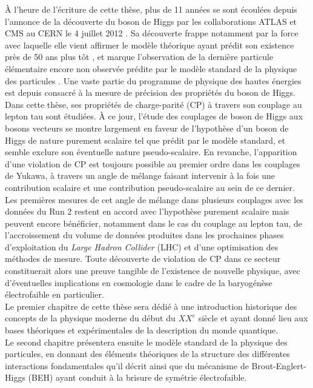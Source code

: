 
À l'heure de l'écriture de cette thèse, plus de 11 années se sont écoulées depuis l'annonce de la découverte du boson de Higgs par les collaborations ATLAS et CMS au CERN le 4 juillet 2012 \cite{ATLASdiscovery,CMSdiscovery}. Sa découverte frappe notamment par la force avec laquelle elle vient affirmer le modèle théorique ayant prédit son existence près de 50 ans plus tôt \cite{BE,H}, et marque l'observation de la dernière particule élémentaire encore non observée prédite par le modèle standard de la physique des particules \cite{SM1,SM2,SM3}. Une vaste partie du programme de physique des hautes énergies est depuis consacré à la mesure de précision des propriétés du boson de Higgs. Dans cette thèse, ses propriétés de charge-parité (CP) à travers son couplage au lepton tau sont étudiées. À ce jour, l'étude des couplages de boson de Higgs aux bosons vecteurs se montre largement en faveur de l'hypothèse d'un boson de Higgs de nature purement scalaire tel que prédit par le modèle standard, et semble exclure son éventuelle nature pseudo-scalaire. En revanche, l'apparition d'une violation de CP est toujours possible au premier ordre dans les couplages de Yukawa, à travers un angle de mélange faisant intervenir à la fois une contribution scalaire et une contribution pseudo-scalaire au sein de ce dernier. Les premières mesures de cet angle de mélange dans plusieurs couplages \cite{ttH,Htautau} avec les données du Run 2 restent en accord avec l'hypothèse purement scalaire mais peuvent encore bénéficier, notamment dans le cas du couplage au lepton tau, de l'accroissement du volume de données produites dans les prochaines phases d'exploitation du \textit{Large Hadron Collider} (LHC) et d'une optimisation des méthodes de mesure. Toute découverte de violation de CP dans ce secteur constituerait alors une preuve tangible de l'existence de nouvelle physique, avec d'éventuelles implications en cosmologie dans le cadre de la baryogénèse électrofaible \cite{EWKbaryogenesis} en particulier. \\

Le premier chapitre de cette thèse sera dédié à une introduction historique des concepts de la physique moderne du début du $XX^e$ siècle et ayant donné lieu aux bases théoriques et expérimentales de la description du monde quantique. \\

Le second chapitre présentera ensuite le modèle standard de la physique des particules, en donnant des éléments théoriques de la structure des différentes interactions fondamentales qu'il décrit ainsi que du mécanisme de Brout-Englert-Higgs (BEH) ayant conduit à la brisure de symétrie électrofaible. \\

